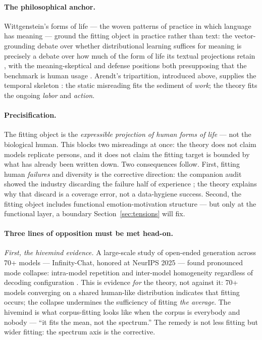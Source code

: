 \documentclass[10pt]{article}
\begin{document}
\paragraph{The philosophical anchor.}
Wittgenstein's forms of life --- the woven patterns of practice in which language has meaning \cite{wittgenstein1953philosophical} --- ground the fitting object in practice rather than text: the vector-grounding debate over whether distributional learning suffices for meaning is precisely a debate over how much of the form of life its textual projections retain \cite{mollo2026vector, mallory2023wittgenstein}, with the meaning-skeptical and defense positions both presupposing that the benchmark is human usage \cite{sogaard2023grounding}. Arendt's tripartition, introduced above, supplies the temporal skeleton \cite{arendt1958human}: the static misreading fits the sediment of \emph{work}; the theory fits the ongoing \emph{labor} and \emph{action}.

\paragraph{Precisification.}
The fitting object is the \emph{expressible projection of human forms of life} --- not the biological human. This blocks two misreadings at once: the theory does not claim models replicate persons, and it does not claim the fitting target is bounded by what has already been written down. Two consequences follow. First, fitting human \emph{failures} and diversity is the corrective direction: the companion audit showed the industry discarding the failure half of experience \cite{yu2026failure}; the theory explains why that discard is a coverage error, not a data-hygiene success. Second, the fitting object includes functional emotion-motivation structure \cite{lehr2025kernels, hu2025generative, anthropic2026emotions} --- but only at the functional layer, a boundary Section~\ref{sec:tensions} will fix.

\paragraph{Three lines of opposition must be met head-on.}

\emph{First, the hivemind evidence.} A large-scale study of open-ended generation across 70+ models --- Infinity-Chat, honored at NeurIPS 2025 --- found pronounced mode collapse: intra-model repetition and inter-model homogeneity regardless of decoding configuration \cite{jiang2025hivemind}. This is evidence \emph{for} the theory, not against it: 70+ models converging on a shared human-like distribution indicates that fitting occurs; the collapse undermines the sufficiency of fitting \emph{the average}. The hivemind is what corpus-fitting looks like when the corpus is everybody and nobody --- ``it fits the mean, not the spectrum.'' The remedy is not less fitting but wider fitting: the spectrum axis is the corrective.
\end{document}
